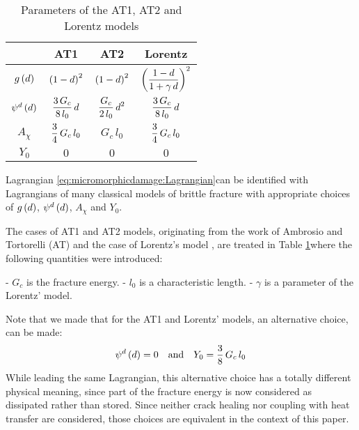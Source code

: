 \begin{table}[H]
    \centering
    \begin{tabular}{||c c c c||} 
        \hline
         & AT1 & AT2 & Lorentz
        \\
        [0.5ex] 
        \hline\hline
        \(g\left(d\right)\)            & \(\left(1-d\right)^{2}\)              & \(\left(1-d\right)^{2}\)               & \(\left(\displaystyle \frac{\displaystyle 1-d}{\displaystyle 1+\gamma\,d}\right)^{2}\)  
        \\
        \({\psi}^{d}\left(d\right)\) & \(\displaystyle \frac{\displaystyle 3\,G_{c}}{\displaystyle 8\,l_{0}}\,d\) & \(\displaystyle \frac{\displaystyle G_{c}}{\displaystyle 2\,l_{0}}\,d^{2}\) & \(\displaystyle \frac{\displaystyle 3\,G_{c}}{\displaystyle 8\,l_{0}}\,d\)         
        \\
        \(A_{\chi}\)              & \(\displaystyle \frac{\displaystyle 3}{\displaystyle 4}\,G_{c}\,l_{0}\)    & \(G_{c}\,l_{0}\)                  & \(\displaystyle \frac{\displaystyle 3}{\displaystyle 4}\,G_{c}\,l_{0}\)    
        \\
        \(Y_{0}\)                 & \(0\)                            & \(0\)                             &  \(0\)   
        \\
        \hline
    \end{tabular}
    \caption{Parameters of the AT1, AT2 and Lorentz models}
    \label{tbl:micromorphicdamage:ATparameters}
\end{table}

Lagrangian \eqref{eq:micromorphicdamage:Lagrangian}can be identified with
Lagrangians of many classical models of brittle fracture with
appropriate choices of \(g\left(d\right)\), \({\psi}^{d}\left(d\right)\),
\(A_{\chi}\) and \(Y_{0}\).

The cases of AT1 and AT2 models, originating from the work of Ambrosio
and Tortorelli (AT) \cite{ambrosio_approximation_1990} and the case of
Lorentz's model \cite{lorentz_gradient_2011,lorentz_convergence_2011}, are
treated in Table \ref{tbl:micromorphicdamage:ATparameters}where the
following quantities were introduced:

- \(G_{c}\) is the fracture energy.
- \(l_{0}\) is a characteristic length.
- \(\gamma\) is a parameter of the Lorentz' model.

Note that we made that for the AT1 and Lorentz' models, an alternative choice, can be made:
\[
{\psi}^{d}\left(d\right)= 0  \quad\text{and}\quad Y_{0}=\displaystyle \frac{\displaystyle 3}{\displaystyle 8}\,G_{c}\,l_{0}
\]
While leading the same Lagrangian, this alternative choice has a totally
different physical meaning, since part of the fracture energy is now
considered as dissipated rather than stored. Since neither crack healing
nor coupling with heat transfer are considered, those choices are
equivalent in the context of this paper.

